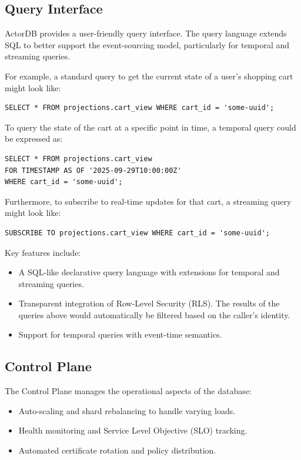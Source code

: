 \documentclass{article}
\begin{document}
\subsection{Query Interface}
ActorDB provides a user-friendly query interface. The query language extends SQL to better support the event-sourcing model, particularly for temporal and streaming queries.

For example, a standard query to get the current state of a user's shopping cart might look like:
\begin{verbatim}
SELECT * FROM projections.cart_view WHERE cart_id = 'some-uuid';
\end{verbatim}

To query the state of the cart at a specific point in time, a temporal query could be expressed as:
\begin{verbatim}
SELECT * FROM projections.cart_view
FOR TIMESTAMP AS OF '2025-09-29T10:00:00Z'
WHERE cart_id = 'some-uuid';
\end{verbatim}

Furthermore, to subscribe to real-time updates for that cart, a streaming query might look like:
\begin{verbatim}
SUBSCRIBE TO projections.cart_view WHERE cart_id = 'some-uuid';
\end{verbatim}

Key features include:
\begin{itemize}
    \item A SQL-like declarative query language with extensions for temporal and streaming queries.
    \item Transparent integration of Row-Level Security (RLS). The results of the queries above would automatically be filtered based on the caller's identity.
    \item Support for temporal queries with event-time semantics.
\end{itemize}

\subsection{Control Plane}
The Control Plane manages the operational aspects of the database:
\begin{itemize}
    \item Auto-scaling and shard rebalancing to handle varying loads.
    \item Health monitoring and Service Level Objective (SLO) tracking.
    \item Automated certificate rotation and policy distribution.
\end{itemize}
\end{document}
